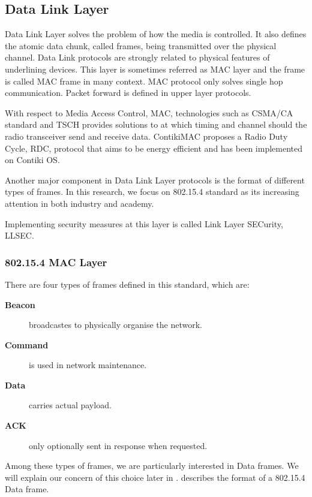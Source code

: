 \subsection{Data Link Layer} \label{Subsec: Data Link Layer}
Data Link Layer solves the problem of how the media is controlled. It also defines the atomic data chunk, called frames, being transmitted over the physical channel. Data Link protocols are strongly related to physical features of underlining devices. This layer is sometimes referred as MAC layer and the frame is called MAC frame in many context. MAC protocol only solves single hop communication. Packet forward is defined in upper layer protocols.

With respect to Media Access Control, MAC, technologies such as CSMA/CA \cite{802154} standard and TSCH\cite{TSCH} provides solutions to at which timing and channel should the radio transceiver send and receive data. ContikiMAC\cite{ContikiMAC} proposes a Radio Duty Cycle, RDC, protocol that aims to be energy efficient and has been implemented on Contiki OS.

Another major component in Data Link Layer protocols is the format of different types of frames. In this research, we focus on 802.15.4 standard as its increasing attention in both industry and academy. 

Implementing security measures at this layer is called Link Layer SECurity, LLSEC. 

\subsubsection{802.15.4 MAC Layer}

There are four types of frames defined in this standard, which are:
\begin{description}
	\item[\textbf{Beacon}] broadcastes to physically organise the network.
	\item[\textbf{Command}] is used in network maintenance.
	\item[\textbf{Data}] carries actual payload.
	\item[\textbf{ACK}] only optionally sent in response when requested.
\end{description}

Among these types of frames, we are particularly interested in Data frames. We will explain our concern of this choice later in .  describes the format of a 802.15.4 Data frame.

